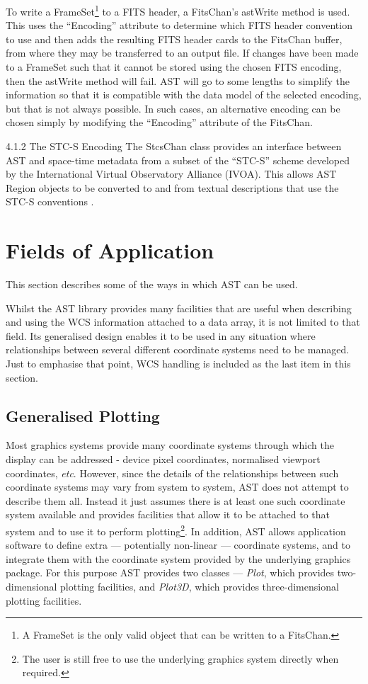 \documentclass[final,authoryear,5p,times,twocolumn]{elsarticle}
\begin{document}
To write a FrameSet\footnote{A FrameSet is the only valid object that
can be written to a FitsChan.} to a FITS header, a FitsChan's astWrite
method is used. This uses the ``Encoding'' attribute to determine which
FITS header convention to use and then adds the resulting FITS header
cards to the FitsChan buffer, from where they may be transferred to an
output file. If changes have been made to a FrameSet such that it cannot
be stored using the chosen FITS encoding, then the astWrite method will
fail. AST will go to some lengths to simplify the information so that it
is compatible with the data model of the selected encoding, but that is
not always possible. In such cases, an alternative encoding can be chosen
simply by modifying the ``Encoding'' attribute of the FitsChan.

4.1.2 The STC-S Encoding
The StcsChan class provides an interface between AST and space-time
metadata from a subset of the ``STC-S'' scheme \citep{STC} developed by the
International Virtual Observatory Alliance (IVOA). This allows AST
Region objects to be converted to and from textual descriptions that
use the STC-S conventions .

\section{Fields of Application}
This section describes some of the ways in which AST can be used.

Whilst the AST library provides many facilities that are useful when
describing and using the WCS information attached to a data array, it
is not limited to that field. Its generalised design enables it to be used
in any situation where relationships between several different coordinate
systems need to be managed. Just to emphasise that point, WCS handling is
included as the last item in this section.

\subsection{Generalised Plotting}
\label{sec:plotting}
Most graphics systems provide many coordinate systems through which the
display can be addressed - device pixel coordinates, normalised viewport
coordinates, \emph{etc}. However, since the details of the relationships
between such coordinate systems may vary from system to system, AST does
not attempt to describe them all. Instead it just assumes there is at
least one such coordinate system available and provides facilities that
allow it to be attached to that system and to use it to perform
plotting\footnote{The user is still free to use the underlying graphics
system directly when required.}. In addition, AST allows application
software to define extra --- potentially non-linear --- coordinate
systems, and to integrate them with the coordinate system provided by the
underlying graphics package. For this purpose AST provides two classes ---
\emph{Plot}, which provides two-dimensional plotting facilities, and
\emph{Plot3D}, which provides three-dimensional plotting facilities.
\end{document}
